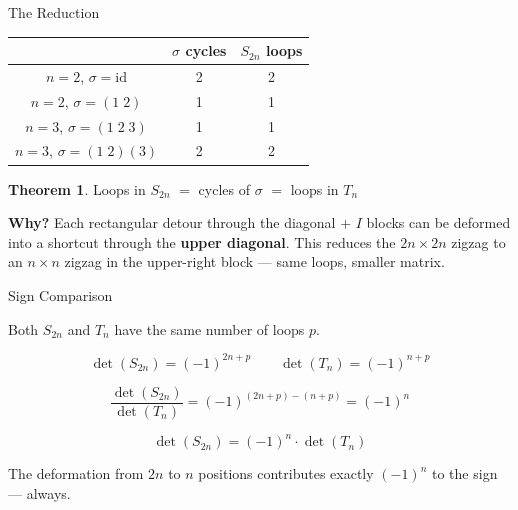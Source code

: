 \documentclass[10pt]{beamer}
\theoremstyle{definition}
\newtheorem{thm}{Theorem}[section]
\newcommand{\x}[1]{\alert{\textbf{#1}}}
\begin{document}
\begin{frame}{The Reduction}

\begin{center}
\renewcommand{\arraystretch}{1.5}
\begin{tabular}{c|c|c}
 & $\sigma$ cycles & $S_{2n}$ loops \\ \hline
$n{=}2$, $\sigma=\text{id}$ & 2 & 2 \\
$n{=}2$, $\sigma=(1\;2)$ & 1 & 1 \\ \hline
$n{=}3$, $\sigma=(1\;2\;3)$ & 1 & 1 \\
$n{=}3$, $\sigma=(1\;2)(3)$ & 2 & 2 \\
\end{tabular}
\end{center}

\vfill

\begin{thm}
Loops in $S_{2n}$ $=$ cycles of $\sigma$ $=$ loops in $T_n$
\end{thm}

\vfill

\textbf{Why?} Each rectangular detour through the diagonal $+$ $I$ blocks can be deformed into a shortcut through the \x{upper diagonal}. This reduces the $2n \times 2n$ zigzag to an $n \times n$ zigzag in the upper-right block --- same loops, smaller matrix.

\end{frame}


\begin{frame}{Sign Comparison}

Both $S_{2n}$ and $T_n$ have the same number of loops $p$.

\vfill

$$\det(S_{2n}) = (-1)^{2n+p} \qquad \det(T_n) = (-1)^{n+p}$$

\vfill

$$\frac{\det(S_{2n})}{\det(T_n)} = (-1)^{(2n+p)-(n+p)} = (-1)^n$$

\vfill

$$\boxed{\det(S_{2n}) = (-1)^n \cdot \det(T_n)}$$

\vfill

The deformation from $2n$ to $n$ positions contributes exactly $(-1)^n$ to the sign --- always.

\end{frame}
\end{document}
